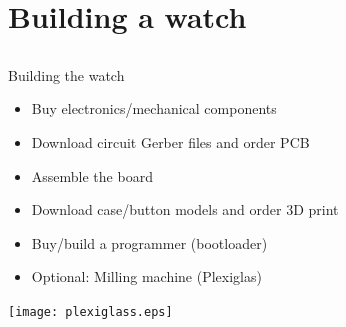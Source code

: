 \documentclass[compress,red]{beamer}
\begin{document}
\section{Building a watch}

\subsection*{} %

\begin{frame}{Building the watch}


  \begin{itemize}
  \item Buy electronics/mechanical components
  \item Download circuit Gerber files and order PCB
  \item Assemble the board
  \item Download case/button models and order 3D print
  \item Buy/build a programmer (bootloader)
  \item Optional: Milling machine (Plexiglas)
  \end{itemize}

  \begin{center}
    \texttt{[image: plexiglass.eps]}
  \end{center}

  \note[item]{}

\end{frame}
\end{document}
